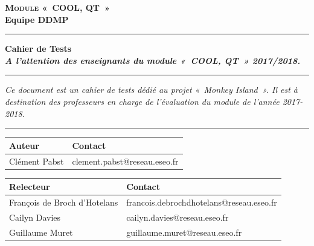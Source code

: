 \documentclass[a4paper,11pt,titlepage]{article}
\newcommand{\TypeDocument}{Cahier de Tests}
\newcommand{\AuteurPrincipal}{Clément Pabst}
\newcommand{\NomGroupeDocument}{Equipe DDMP}
\newcommand{\IntituleDocument}{Module «~COOL, QT~»}
\newcommand{\PorteeDocument}{A l'attention des enseignants du module «~COOL, QT~» 2017/2018.}
\begin{document}

\sloppy%
\renewcommand{\arraystretch}{1.5}


\vspace{-2cm}%
\begin{center}%
{\Large {\textsc{\bf \IntituleDocument}}}
\vspace{0.4cm}\\
{\large\bf \NomGroupeDocument}

\rule[0.5ex]{0.52\textwidth}{0.1mm}

\vspace{0.2cm}
{\Large\bf{\TypeDocument}}
\vspace{0.2cm}\\
{\Large\bf\textit{\PorteeDocument}}
\end{center}

\vspace{-0.2cm}
\noindent\rule[0.5ex]{\textwidth}{0.1mm}
\textit{Ce document est un cahier de tests dédié au projet «~Monkey Island~». Il est à destination des professeurs en charge de l'évaluation du module de l'année 2017-2018.}\\
\rule[0.5ex]{\textwidth}{0.1mm}

\vspace{1cm}
\begin{tabular}{|p{5cm}|p{9cm}|}
\hline
\textbf{Auteur} & \textbf{Contact} \\\hline
\AuteurPrincipal & clement.pabst@reseau.eseo.fr\\\hline
\end{tabular}

\vspace{0.5cm}
\begin{tabular}{|p{5cm}|p{9cm}|}\hline
\textbf{Relecteur} & \textbf{Contact} \\\hline
François de Broch d'Hotelans & francois.debrochdhotelans@reseau.eseo.fr\\\hline
Cailyn Davies & cailyn.davies@reseau.eseo.fr\\\hline
Guillaume Muret & guillaume.muret@reseau.eseo.fr\\\hline
\end{tabular}

\newpage
\end{document}
